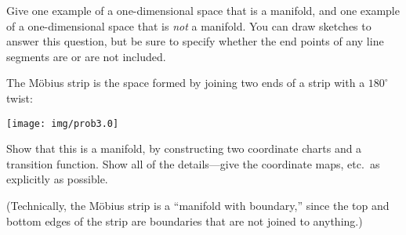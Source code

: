 
\begin{xca}[Manifolds]
Give one example of a one-dimensional space that is a manifold,
and one example of a one-dimensional space that is \emph{not} a
manifold. You can draw sketches to answer this question, but be
sure to specify whether the end points of any line segments are
or are not included.
\end{xca}
\begin{xca}
The M\"obius strip is the space formed by joining two ends of a strip with a $180^{\circ}$ twist:

\begin{center}
  \texttt{[image: img/prob3.0]}
\end{center}

Show that this is a manifold, by constructing two coordinate
charts and a transition function. Show all of the details---give
the coordinate maps, etc.~as explicitly as possible.

(Technically, the M\"obius strip is a ``manifold with boundary,''
since the top and bottom edges of the strip are boundaries that
are not joined to anything.)
\end{xca}
